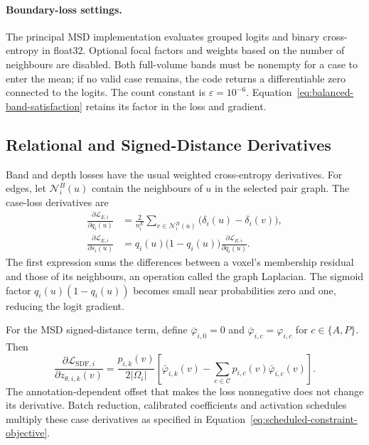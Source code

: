 \documentclass[12pt,a4paper]{article}
\begin{document}
\paragraph{Boundary-loss settings.}
\label{sec:band-implementation-details}

The principal MSD implementation evaluates grouped logits and binary
cross-entropy in float32. Optional focal factors and weights based on the
number of neighbours are disabled. Both full-volume bands must be nonempty
for a case to enter the mean; if no valid case remains, the code returns a
differentiable zero connected to the logits. The count constant is
$\varepsilon=10^{-6}$. Equation~\ref{eq:balanced-band-satisfaction} retains
its factor in the loss and gradient.


\subsection{Relational and Signed-Distance Derivatives}

Band and depth losses have the usual weighted cross-entropy derivatives.
For edges, let $\mathcal N_i^B(u)$ contain the neighbours of $u$ in
the selected pair graph. The case-loss derivatives are
\begin{equation}
\begin{aligned}
\frac{\partial\mathcal{L}_{E,i}}{\partial q_i(u)}
 &=\frac{2}{n_i^E}\sum_{v\in\mathcal{N}_i^B(u)}
       \bigl(\delta_i(u)-\delta_i(v)\bigr),\\
\frac{\partial\mathcal{L}_{E,i}}{\partial s_i(u)}
 &=q_i(u)\bigl(1-q_i(u)\bigr)
   \frac{\partial\mathcal{L}_{E,i}}{\partial q_i(u)}.
\end{aligned}
\label{eq:edge-logit-gradient}
\end{equation}
The first expression sums the differences between a voxel's membership
residual and those of its neighbours, an operation called the graph
Laplacian. The sigmoid factor $q_i(u)(1-q_i(u))$ becomes small near
probabilities zero and one, reducing the logit gradient.

For the MSD signed-distance term, define $\bar\varphi_{i,0}=0$ and
$\bar\varphi_{i,c}=\varphi_{i,c}$ for $c\in\{A,P\}$. Then
\begin{equation}
\frac{\partial\mathcal{L}_{\mathrm{SDF},i}}
     {\partial z_{\theta,i,k}(v)}
=\frac{p_{i,k}(v)}{2|\Omega_i|}
 \left[\bar\varphi_{i,k}(v)
       -\sum_{c\in\mathcal{C}}p_{i,c}(v)\bar\varphi_{i,c}(v)\right].
\label{eq:sdf-logit-gradient}
\end{equation}
The annotation-dependent offset that makes the loss nonnegative does
not change its derivative. Batch reduction, calibrated coefficients and
activation schedules multiply these case derivatives as specified in
Equation~\ref{eq:scheduled-constraint-objective}.
\end{document}
